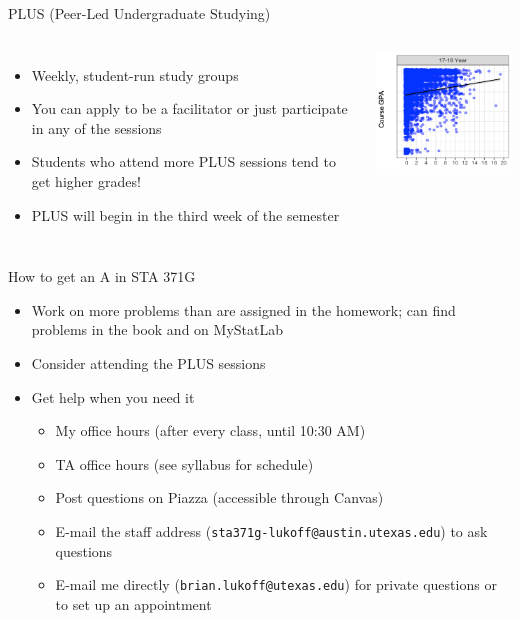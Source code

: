 \documentclass{beamer}\usepackage[]{graphicx}\usepackage[]{color}
\begin{document}
\begin{darkframes}
    \begin{frame}{PLUS (Peer-Led Undergraduate Studying)}
      \begin{columns}[onlytextwidth]
          \begin{itemize}
            \item Weekly, student-run study groups
            \item You can apply to be a facilitator or just participate in any of the sessions
            \item Students who attend more PLUS sessions tend to get higher grades!
            \item PLUS will begin in the third week of the semester
          \end{itemize}
          \includegraphics[width=2in]{plus}
      \end{columns}
    \end{frame}

    \begin{frame}{How to get an A in STA 371G}
      \begin{itemize}
        \item Work on more problems than are assigned in the homework; can find problems in the book and on MyStatLab
        \item Consider attending the PLUS sessions
        \item Get help when you need it
          \begin{itemize}
            \item My office hours (after every class, until 10:30 AM)
            \item TA office hours (see syllabus for schedule)
            \item Post questions on Piazza (accessible through Canvas)
            \item E-mail the staff address (\texttt{sta371g-lukoff@austin.utexas.edu}) to ask questions
            \item E-mail me directly (\texttt{brian.lukoff@utexas.edu}) for private questions or to set up an appointment
          \end{itemize}
      \end{itemize}
    \end{frame}


\end{darkframes}
\end{document}

